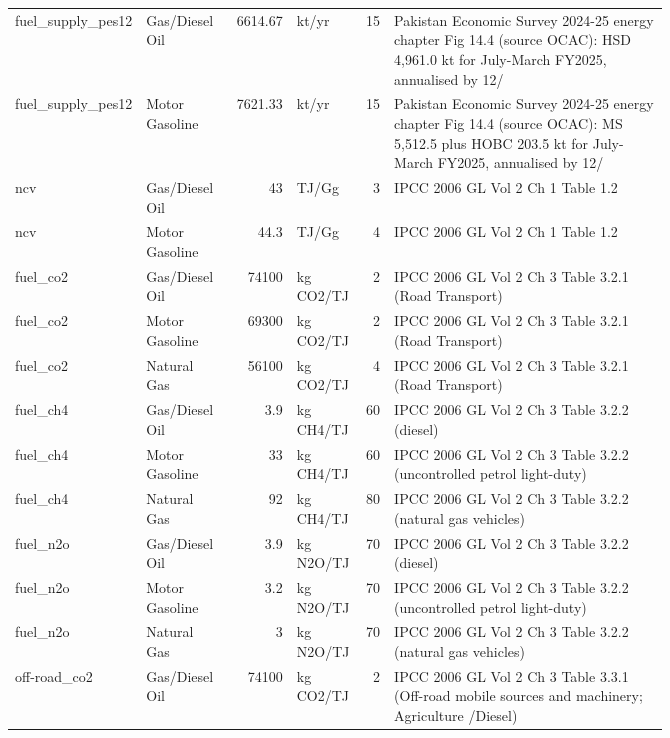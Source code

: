 {\begin{longtable}{@{}>{\raggedright\arraybackslash}p{0.12\linewidth}>{\raggedright\arraybackslash}p{0.13\linewidth}r>{\raggedright\arraybackslash}p{0.09\linewidth}r>{\raggedright\arraybackslash}p{0.42\linewidth}@{}}
fuel\_\allowbreak supply\_\allowbreak pes12 & Gas/\allowbreak Diesel Oil & 6614.67 & kt/\allowbreak yr & 15 & Pakistan Economic Survey 2024-25 energy chapter Fig 14.4 (source OCAC): HSD 4,961.0 kt for July-March FY2025, annualised by 12/\allowbreak 9 \\
fuel\_\allowbreak supply\_\allowbreak pes12 & Motor Gasoline & 7621.33 & kt/\allowbreak yr & 15 & Pakistan Economic Survey 2024-25 energy chapter Fig 14.4 (source OCAC): MS 5,512.5 plus HOBC 203.5 kt for July-March FY2025, annualised by 12/\allowbreak 9 \\
ncv & Gas/\allowbreak Diesel Oil & 43 & TJ/\allowbreak Gg & 3 & IPCC 2006 GL Vol 2 Ch 1 Table 1.2 \\
ncv & Motor Gasoline & 44.3 & TJ/\allowbreak Gg & 4 & IPCC 2006 GL Vol 2 Ch 1 Table 1.2 \\
fuel\_\allowbreak co2 & Gas/\allowbreak Diesel Oil & 74100 & kg CO2/\allowbreak TJ & 2 & IPCC 2006 GL Vol 2 Ch 3 Table 3.2.1 (Road Transport) \\
fuel\_\allowbreak co2 & Motor Gasoline & 69300 & kg CO2/\allowbreak TJ & 2 & IPCC 2006 GL Vol 2 Ch 3 Table 3.2.1 (Road Transport) \\
fuel\_\allowbreak co2 & Natural Gas & 56100 & kg CO2/\allowbreak TJ & 4 & IPCC 2006 GL Vol 2 Ch 3 Table 3.2.1 (Road Transport) \\
fuel\_\allowbreak ch4 & Gas/\allowbreak Diesel Oil & 3.9 & kg CH4/\allowbreak TJ & 60 & IPCC 2006 GL Vol 2 Ch 3 Table 3.2.2 (diesel) \\
fuel\_\allowbreak ch4 & Motor Gasoline & 33 & kg CH4/\allowbreak TJ & 60 & IPCC 2006 GL Vol 2 Ch 3 Table 3.2.2 (uncontrolled petrol light-duty) \\
fuel\_\allowbreak ch4 & Natural Gas & 92 & kg CH4/\allowbreak TJ & 80 & IPCC 2006 GL Vol 2 Ch 3 Table 3.2.2 (natural gas vehicles) \\
fuel\_\allowbreak n2o & Gas/\allowbreak Diesel Oil & 3.9 & kg N2O/\allowbreak TJ & 70 & IPCC 2006 GL Vol 2 Ch 3 Table 3.2.2 (diesel) \\
fuel\_\allowbreak n2o & Motor Gasoline & 3.2 & kg N2O/\allowbreak TJ & 70 & IPCC 2006 GL Vol 2 Ch 3 Table 3.2.2 (uncontrolled petrol light-duty) \\
fuel\_\allowbreak n2o & Natural Gas & 3 & kg N2O/\allowbreak TJ & 70 & IPCC 2006 GL Vol 2 Ch 3 Table 3.2.2 (natural gas vehicles) \\
off-road\_\allowbreak co2 & Gas/\allowbreak Diesel Oil & 74100 & kg CO2/\allowbreak TJ & 2 & IPCC 2006 GL Vol 2 Ch 3 Table 3.3.1 (Off-road mobile sources and machinery; Agriculture /\allowbreak  Diesel) \\

\end{longtable}}
